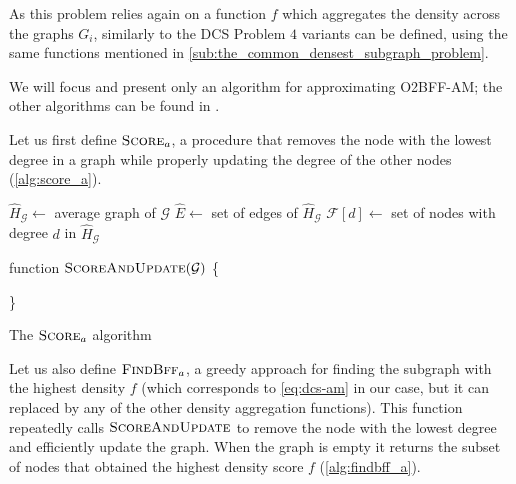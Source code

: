 As this problem relies again on a function $f$ which aggregates the density
across the graphs $G_i$, similarly to the \acrshort{DCS} Problem $4$ variants
can be defined, using the same functions mentioned in
\autoref{sub:the_common_densest_subgraph_problem}.

We will focus and present only an algorithm for approximating
\acrshort{O2BFF}-AM; the other algorithms can be found in
\cite{semertzidis2019finding}.

Let us first define $\textsc{Score}_{a}  $, a procedure that removes the node
with the lowest degree in a graph while properly updating the degree of the
other nodes (\autoref{alg:score_a}).

\begin{algorithm}
	\SetAlgoLined
	$\hat{H}_{\mathcal{G} } \leftarrow $ average graph of $\mathcal{G} $ \;
	$\hat{E} \leftarrow $ set of edges of $\hat{H}_{\mathcal{G} }  $ \;
	$\mathcal{F}[d] \leftarrow $ set of nodes with degree
	\footnotemark
	$d$ in $\hat{H}_{\mathcal{G} }  $\;

	\bigskip

	{function \textnormal{$\textsc{ScoreAndUpdate}( \mathcal{G} )$ \{ }}
	{}

	\}
	\caption{The $\textsc{Score}_{a}  $ algorithm}
	\label{alg:score_a}
\end{algorithm}


Let us also define $\textsc{FindBff}_{a} $, a greedy approach for finding
the subgraph with the highest density $f$ (which corresponds to
\autoref{eq:dcs-am} in our case, but it can replaced by any of the other
density aggregation functions). This function repeatedly calls
$\textsc{ScoreAndUpdate}$ to remove the node with the lowest degree and efficiently update
the graph. When the graph is empty it returns the subset of nodes
that obtained the highest density score $f$ (\autoref{alg:findbff_a}).

